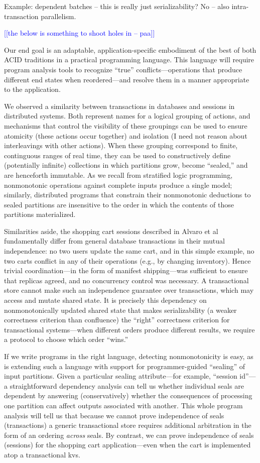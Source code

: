 \documentclass{sig-alternate}
\newcommand{\paa}[1]{{\textcolor{blue}{[[#1 -- paa]]}}}
\begin{document}
Example: dependent batches -- this is really just serializability?  No -- also
intra-transaction parallelism.

\paa{the below is something to shoot holes in}

Our end goal is an adaptable, application-specific embodiment of the best of both ACID traditions in a practical programming language. This language will require program analysis tools to recognize ``true'' conflicts---operations that produce different end states when reordered---and resolve them in a manner appropriate to the application.

We observed a similarity between transactions in databases and sessions in distributed systems.  Both represent names for a logical grouping of actions, and mechanisms that control the visibility of these groupings can be used to ensure atomicity (these actions occur together) and isolation (I need not reason about interleavings with other actions).  When these grouping correspond to finite, continguous ranges of real time, they can be used to constructively define (potentially infinite) collections in which partitions grow, become ``sealed,'' and are henceforth immutable.  As we recall from stratified logic programming, nonmonotonic operations against complete inputs produce a single model; similarly, distributed programs that constrain their nonmonotonic deductions to sealed partitions are insensitive to the order in which the contents of those partitions materialized.
 
Similarities aside, the shopping cart sessions described in Alvaro et al fundamentally differ from general database transactions in their mutual independence: no two users update the same cart, and in this simple example, no two carts conflict in any of their operations (e.g., by changing inventory).  Hence trivial coordination---in the form of manifest shipping---was sufficient to ensure that replicas agreed, and no concurrency control was necessary.  A transactional store cannot make such an independence guarantee over transactions, which may access and mutate shared state.   It is precisely this dependency on nonmonotonically updated shared state that makes serializability (a weaker correctness criterion than confluence) the ``right'' correctness criterion for transactional systems---when different orders produce different results, we require a protocol to choose which order ``wins.'' 

If we write programs in the right language, detecting nonmonotonicity is easy, as is extending such a language with support for programmer-guided ``sealing'' of input partitions.  Given a particular sealing attribute---for example, ``session id''---a straightforward dependency analysis can tell us whether individual seals are dependent by answering (conservatively) whether the consequences of processing one partition can affect outputs associated with another.  This whole program analysis will tell us that because we cannot prove independence of seals (transactions) a generic transactional store requires additional arbitration in the form of an ordering \emph{across} seals.  By contrast, we can prove independence of seals (sessions) for the shopping cart application---even when the cart is implemented atop a transactional kvs.  
\end{document}
